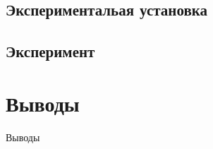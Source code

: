 \documentclass[12pt]{article}
\begin{document}
        \subsection{Экспериментальая установка}


        \subsection{Эксперимент}
    
    \section{Выводы}
        Выводы

    
\end{document}
